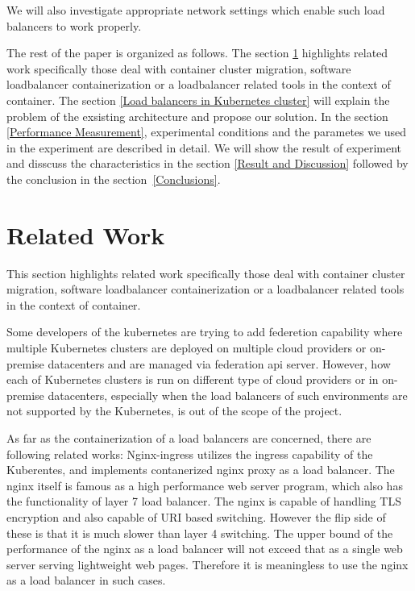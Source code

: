 We will also investigate appropriate network settings which enable such load balancers to work properly.

The rest of the paper is organized as follows.
The section \ref{Related Work} highlights related work specifically those deal with container cluster migration, 
software loadbalancer containerization or a loadbalancer related tools in the context of container. 
The section \ref{Load balancers in Kubernetes cluster} will explain the problem of the exsisting architecture and propose our solution.
In the section \ref{Performance Measurement}, experimental conditions and the parametes we used in the experiment are described in detail.
We will show the result of experiment and disscuss the characteristics in the section \ref{Result and Discussion} 
followed by the conclusion in the section~\ref{Conclusions}.
  

\section{Related Work}\label{Related Work}
This section highlights related work specifically those deal with container cluster migration, 
software loadbalancer containerization or a loadbalancer related tools in the context of container. 

Some developers of the kubernetes are trying to add federetion\cite{K8sFederation2017} capability 
where multiple Kubernetes clusters are deployed on multiple cloud providers or on-premise datacenters 
and are managed via federation api server. However, how each of Kubernetes clusters is run on different type of cloud providers
or in on-premise datacenters, especially when the load balancers of such environments are not supported by the Kubernetes, 
is out of the scope of the project. 
   
As far as the containerization of a load balancers are concerned, there are following related works:
Nginx-ingress\cite{Pleshakov2016,NginxInc2016} utilizes the ingress\cite{K8sIngress2017} capability of the Kuberentes, 
and implements contanerized nginx proxy as a load balancer. The nginx itself is famous as a high performance web server program,
which also has the functionality of layer 7 load balancer. The nginx is capable of handling TLS encryption and also capable of  
URI based switching. However the flip side of these is that it is much slower than layer 4 switching.
The upper bound of the performance of the nginx as a load balancer will not exceed that as a single web server serving lightweight web pages. 
Therefore it is meaningless to use the nginx as a load balancer in such cases.
 
